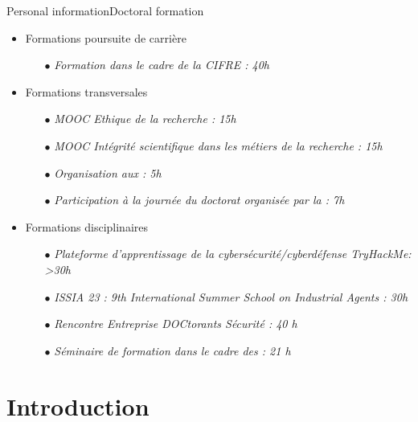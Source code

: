 \begin{frame}{Personal information}{Doctoral formation}

    \begin{itemize}
        \item Formations poursuite de carrière
              \begin{itemize}
                  \item[$\bullet$] \textit{Formation dans le cadre de la CIFRE : 40h}
              \end{itemize}
        \item Formations transversales
              \begin{itemize}
                  \item[$\bullet$] \textit{MOOC Ethique de la recherche : 15h}
                  \item[$\bullet$] \textit{MOOC Intégrité scientifique dans les métiers de la recherche : 15h}
                  \item[$\bullet$] \textit{Organisation aux  : 5h }
                  \item[$\bullet$] \textit{Participation à la journée du doctorat organisée par la  : 7h}
              \end{itemize}
        \item Formations disciplinaires
              \begin{itemize}
                  \item[$\bullet$] \textit{Plateforme d'apprentissage de la cybersécurité/cyberdéfense \textit{TryHackMe}: >30h}
                  \item[$\bullet$] \textit{ISSIA 23 : 9th International Summer School on Industrial Agents : 30h}
                  \item[$\bullet$] \textit{Rencontre Entreprise DOCtorants Sécurité : 40 h}
                  \item[$\bullet$] \textit{Séminaire de formation dans le cadre des  : 21 h}
              \end{itemize}
    \end{itemize}

\end{frame}

\section{Introduction}

